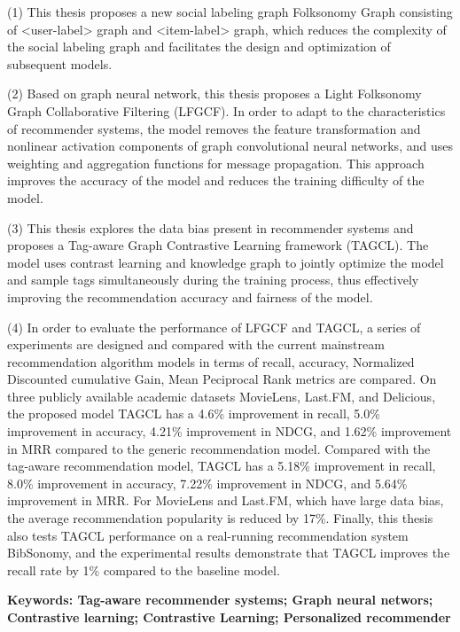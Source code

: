 (1) This thesis proposes a new social labeling graph Folksonomy Graph consisting of <user-label> graph and <item-label> graph, which reduces the complexity of the social labeling graph and facilitates the design and optimization of subsequent models.

(2) Based on graph neural network, this thesis proposes a Light Folksonomy Graph Collaborative Filtering (LFGCF). In order to adapt to the characteristics of recommender systems, the model removes the feature transformation and nonlinear activation components of graph convolutional neural networks, and uses weighting and aggregation functions for message propagation. This approach improves the accuracy of the model and reduces the training difficulty of the model.

(3) This thesis explores the data bias present in recommender systems and proposes a Tag-aware Graph Contrastive Learning framework (TAGCL). The model uses contrast learning and knowledge graph to jointly optimize the model and sample tags simultaneously during the training process, thus effectively improving the recommendation accuracy and fairness of the model.

(4) In order to evaluate the performance of LFGCF and TAGCL, a series of experiments are designed and compared with the current mainstream recommendation algorithm models in terms of recall, accuracy, Normalized Discounted cumulative Gain, Mean Peciprocal Rank metrics are compared. On three publicly available academic datasets MovieLens, Last.FM, and Delicious, the proposed model TAGCL has a 4.6\% improvement in recall, 5.0\% improvement in accuracy, 4.21\% improvement in NDCG, and 1.62\% improvement in MRR compared to the generic recommendation model. Compared with the tag-aware recommendation model, TAGCL has a 5.18\% improvement in recall, 8.0\% improvement in accuracy, 7.22\% improvement in NDCG, and 5.64\% improvement in MRR. For MovieLens and Last.FM, which have large data bias, the average recommendation popularity is reduced by 17\%. Finally, this thesis also tests TAGCL performance on a real-running recommendation system BibSonomy, and the experimental results demonstrate that TAGCL improves the recall rate by 1\% compared to the baseline model.

\vspace{20pt}
\noindent \textbf{Keywords: Tag-aware recommender systems; Graph neural networs; Contrastive learning; Contrastive Learning; Personalized recommender}
\clearpage
